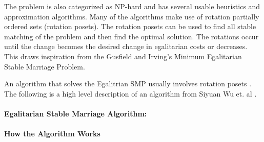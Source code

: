 The problem is also categorized as NP-hard and has several usable heuristics and approximation algorithms. Many of the algorithms make use of rotation partially ordered sets (rotation posets). The rotation posets can be used to find all stable matching of the problem and then find the optimal solution. The rotations occur until the change becomes the desired change in egalitarian costs or decreases. This draws inspiration from the Gusfield and Irving's Minimum Egalitarian Stable Marriage Problem\cite{gusfield}.

An algorithm that solves the Egalitrian SMP usually involves rotation posets \cite{mcdermid}. The following is a high level description of an algorithm from Siyuan Wu et. al \cite{wu}.

\paragraph{Egalitarian Stable Marriage Algorithm:}

\paragraph{How the Algorithm Works}

